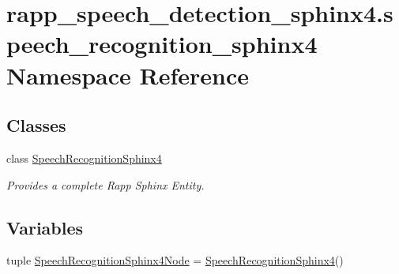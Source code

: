 \hypertarget{namespacerapp__speech__detection__sphinx4_1_1speech__recognition__sphinx4}{\section{rapp\-\_\-speech\-\_\-detection\-\_\-sphinx4.\-speech\-\_\-recognition\-\_\-sphinx4 Namespace Reference}
\label{namespacerapp__speech__detection__sphinx4_1_1speech__recognition__sphinx4}
}
\subsection*{Classes}
\begin{DoxyCompactItemize}
\item 
class \hyperlink{classrapp__speech__detection__sphinx4_1_1speech__recognition__sphinx4_1_1SpeechRecognitionSphinx4}{Speech\-Recognition\-Sphinx4}
\begin{DoxyCompactList}\small\item\em Provides a complete Rapp Sphinx Entity. \end{DoxyCompactList}\end{DoxyCompactItemize}
\subsection*{Variables}
\begin{DoxyCompactItemize}
\item 
tuple \hyperlink{namespacerapp__speech__detection__sphinx4_1_1speech__recognition__sphinx4_a1f7be52b8e1565fce0c39407a1d72775}{Speech\-Recognition\-Sphinx4\-Node} = \hyperlink{classrapp__speech__detection__sphinx4_1_1speech__recognition__sphinx4_1_1SpeechRecognitionSphinx4}{Speech\-Recognition\-Sphinx4}()
\end{DoxyCompactItemize}


